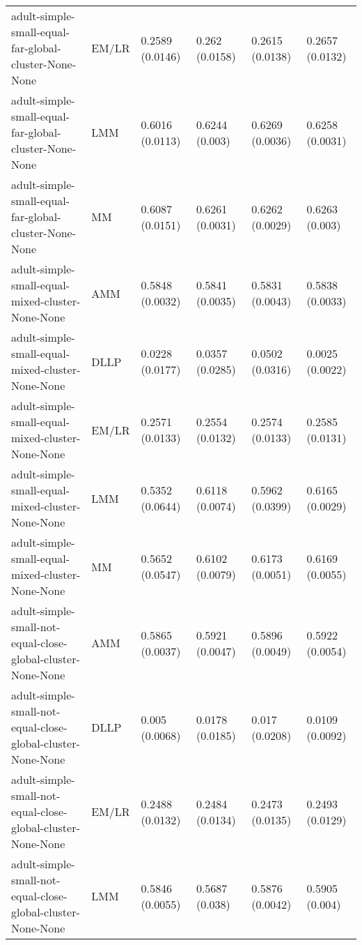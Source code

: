 \begin{longtable}{llllll}
                                  adult-simple-small-equal-far-global-cluster-None-None &     EM/LR & 0.2589 (0.0146) &   0.262 (0.0158) &   0.2615 (0.0138) &     0.2657 (0.0132) \\
                                  adult-simple-small-equal-far-global-cluster-None-None &       LMM & 0.6016 (0.0113) &   0.6244 (0.003) &   0.6269 (0.0036) &     0.6258 (0.0031) \\
                                  adult-simple-small-equal-far-global-cluster-None-None &        MM & 0.6087 (0.0151) &  0.6261 (0.0031) &   0.6262 (0.0029) &      0.6263 (0.003) \\
                                       adult-simple-small-equal-mixed-cluster-None-None &       AMM & 0.5848 (0.0032) &  0.5841 (0.0035) &   0.5831 (0.0043) &     0.5838 (0.0033) \\
                                       adult-simple-small-equal-mixed-cluster-None-None &      DLLP & 0.0228 (0.0177) &  0.0357 (0.0285) &   0.0502 (0.0316) &     0.0025 (0.0022) \\
                                       adult-simple-small-equal-mixed-cluster-None-None &     EM/LR & 0.2571 (0.0133) &  0.2554 (0.0132) &   0.2574 (0.0133) &     0.2585 (0.0131) \\
                                       adult-simple-small-equal-mixed-cluster-None-None &       LMM & 0.5352 (0.0644) &  0.6118 (0.0074) &   0.5962 (0.0399) &     0.6165 (0.0029) \\
                                       adult-simple-small-equal-mixed-cluster-None-None &        MM & 0.5652 (0.0547) &  0.6102 (0.0079) &   0.6173 (0.0051) &     0.6169 (0.0055) \\
                            adult-simple-small-not-equal-close-global-cluster-None-None &       AMM & 0.5865 (0.0037) &  0.5921 (0.0047) &   0.5896 (0.0049) &     0.5922 (0.0054) \\
                            adult-simple-small-not-equal-close-global-cluster-None-None &      DLLP &  0.005 (0.0068) &  0.0178 (0.0185) &    0.017 (0.0208) &     0.0109 (0.0092) \\
                            adult-simple-small-not-equal-close-global-cluster-None-None &     EM/LR & 0.2488 (0.0132) &  0.2484 (0.0134) &   0.2473 (0.0135) &     0.2493 (0.0129) \\
                            adult-simple-small-not-equal-close-global-cluster-None-None &       LMM & 0.5846 (0.0055) &   0.5687 (0.038) &   0.5876 (0.0042) &      0.5905 (0.004) \\

\end{longtable}
